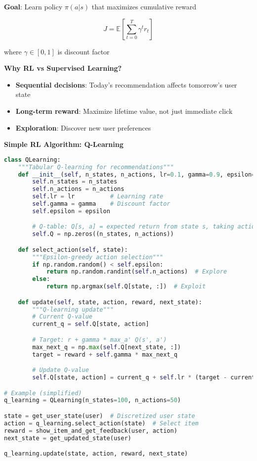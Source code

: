 \documentclass[10pt]{article}
\begin{document}
\textbf{Goal}: Learn policy $\pi(a|s)$ that maximizes cumulative reward

$$J = \mathbb{E}\left[\sum_{t=0}^T \gamma^t r_t\right]$$

where $\gamma \in [0, 1]$ is discount factor

\textbf{Why RL vs Supervised Learning?}
\begin{itemize}
\item \textbf{Sequential decisions}: Today's recommendation affects tomorrow's user state
\item \textbf{Long-term reward}: Maximize lifetime value, not just immediate click
\item \textbf{Exploration}: Discover new user preferences
\end{itemize}

\textbf{Simple RL Algorithm: Q-Learning}

\begin{lstlisting}[language=Python]
class QLearning:
    """Tabular Q-learning for recommendations"""
    def __init__(self, n_states, n_actions, lr=0.1, gamma=0.9, epsilon=0.1):
        self.n_states = n_states
        self.n_actions = n_actions
        self.lr = lr          # Learning rate
        self.gamma = gamma    # Discount factor
        self.epsilon = epsilon

        # Q-table: Q[s, a] = expected return from state s, taking action a
        self.Q = np.zeros((n_states, n_actions))

    def select_action(self, state):
        """Epsilon-greedy action selection"""
        if np.random.random() < self.epsilon:
            return np.random.randint(self.n_actions)  # Explore
        else:
            return np.argmax(self.Q[state, :])  # Exploit

    def update(self, state, action, reward, next_state):
        """Q-learning update"""
        # Current Q-value
        current_q = self.Q[state, action]

        # Target: r + gamma * max_a' Q(s', a')
        max_next_q = np.max(self.Q[next_state, :])
        target = reward + self.gamma * max_next_q

        # Update Q-value
        self.Q[state, action] = current_q + self.lr * (target - current_q)

# Example (simplified)
q_learning = QLearning(n_states=100, n_actions=50)

state = get_user_state(user)  # Discretized user state
action = q_learning.select_action(state)  # Select item
reward = show_item_and_get_feedback(user, action)
next_state = get_updated_state(user)

q_learning.update(state, action, reward, next_state)
\end{lstlisting}
\end{document}
